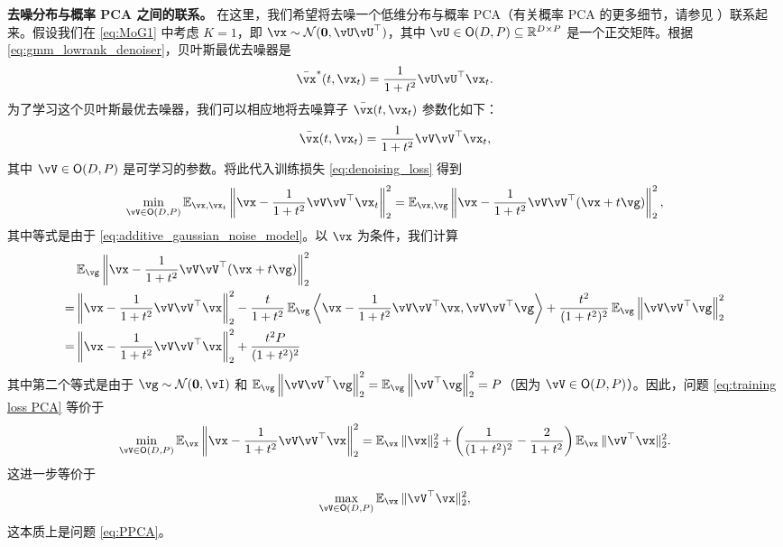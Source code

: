 \documentclass[../../book-main.tex]{subfiles}
\begin{document}
\begin{remark}
{\bf 去噪分布与概率 PCA 之间的联系。} 在这里，我们希望将去噪一个低维分布与概率 PCA（有关概率 PCA 的更多细节，请参见 ）联系起来。假设我们在 \eqref{eq:MoG1} 中考虑 $K=1$，即 $\vx \sim   \dNorm(\vzero, \vU\vU^{\top})$，其中 \(\vU \in \O(D, P) \subseteq \R^{D \times P}\) 是一个正交矩阵。根据 \eqref{eq:gmm_lowrank_denoiser}，贝叶斯最优去噪器是
\begin{align}
    \bar{\vx}^{\ast}(t, \vx_{t}) = \frac{1}{1 + t^{2}} \vU\vU^\top\vx_t. 
\end{align}
为了学习这个贝叶斯最优去噪器，我们可以相应地将去噪算子 $\bar{\vx}(t,\vx_t)$ 参数化如下：
\begin{align}
    \bar{\vx}(t,\vx_t) = \frac{1}{1 + t^{2}} \vV\vV^\top\vx_t,
\end{align}
其中 $\vV \in \O(D, P)$ 是可学习的参数。将此代入训练损失 \eqref{eq:denoising_loss} 得到
\begin{equation}\label{eq:training loss PCA}
	  \min_{\vV \in \O(D, P)}\Ex_{\vx, \vx_{t}}\left\|\vx - \frac{1}{1 + t^{2}} \vV\vV^\top\vx_t\right\|_{2}^{2} = \Ex_{\vx, \vg}\left\|\vx - \frac{1}{1 + t^{2}} \vV\vV^\top(\vx + t\vg)\right\|_{2}^{2},
\end{equation}
其中等式是由于 \eqref{eq:additive_gaussian_noise_model}。以 $\vx$ 为条件，我们计算
\begin{align}
    & \Ex_{\vg}\left\|\vx - \frac{1}{1 + t^{2}} \vV\vV^\top(\vx + t\vg)\right\|_{2}^{2} \\
    = & \left\|\vx - \frac{1}{1 + t^{2}} \vV\vV^\top \vx\right\|_{2}^{2} - \frac{t}{1+t^2}\Ex_{\vg} \left\langle \vx - \frac{1}{1 + t^{2}} \vV\vV^\top \vx,  \vV\vV^\top\vg \right\rangle + \frac{t^2}{(1+t^2)^2} \Ex_{\vg}\left\| \vV\vV^\top \vg \right\|_2^2 \\
    = & \left\|\vx - \frac{1}{1 + t^{2}} \vV\vV^\top \vx\right\|_{2}^{2} + \frac{t^2P}{(1+t^2)^2} 
\end{align}
其中第二个等式是由于 \(\vg \sim \dNorm(\vzero, \vI)\) 和 $ \Ex_{\vg}\left\| \vV\vV^\top \vg \right\|_2^2 = \Ex_{\vg}\left\|\vV^\top \vg \right\|_2^2 = P$（因为 $\vV \in \O(D, P)$）。因此，问题 \eqref{eq:training loss PCA} 等价于
\begin{align}
    \min_{\vV \in \O(D, P)}\Ex_{\vx} \left\|\vx - \frac{1}{1 + t^{2}} \vV\vV^\top \vx\right\|_{2}^{2} = \Ex_{\vx} \|\vx\|_2^2 + \left( \frac{1}{(1+t^2)^2} - \frac{2}{1+t^2} \right) \Ex_{\vx}\|\vV^\top \vx\|_2^2.
\end{align}
这进一步等价于
\begin{align}
    \max_{\vV \in \O(D, P)} \Ex_{\vx}\|\vV^\top \vx\|_2^2,
\end{align}
这本质上是问题 \eqref{eq:PPCA}。
\end{remark}
\end{document}
